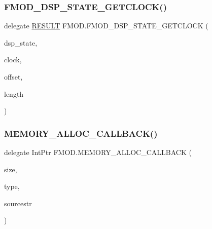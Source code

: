 \subsubsection{\texorpdfstring{F\+M\+O\+D\+\_\+\+D\+S\+P\+\_\+\+S\+T\+A\+T\+E\+\_\+\+G\+E\+T\+C\+L\+O\+C\+K()}{FMOD\_DSP\_STATE\_GETCLOCK()}}
{\footnotesize\ttfamily delegate \hyperlink{namespace_f_m_o_d_a305d1176ef3f8c8815861a60407ac33d}{R\+E\+S\+U\+LT} F\+M\+O\+D.\+F\+M\+O\+D\+\_\+\+D\+S\+P\+\_\+\+S\+T\+A\+T\+E\+\_\+\+G\+E\+T\+C\+L\+O\+CK (\begin{DoxyParamCaption}\item[{ref \hyperlink{struct_f_m_o_d_1_1_d_s_p___s_t_a_t_e}{D\+S\+P\+\_\+\+S\+T\+A\+TE}}]{dsp\+\_\+state,  }\item[{out ulong}]{clock,  }\item[{out uint}]{offset,  }\item[{out uint}]{length }\end{DoxyParamCaption})}

\mbox{\label{namespace_f_m_o_d_aff9ff44d1da401acbc19faf64e06a776}} 
\subsubsection{\texorpdfstring{M\+E\+M\+O\+R\+Y\+\_\+\+A\+L\+L\+O\+C\+\_\+\+C\+A\+L\+L\+B\+A\+C\+K()}{MEMORY\_ALLOC\_CALLBACK()}}
{\footnotesize\ttfamily delegate Int\+Ptr F\+M\+O\+D.\+M\+E\+M\+O\+R\+Y\+\_\+\+A\+L\+L\+O\+C\+\_\+\+C\+A\+L\+L\+B\+A\+CK (\begin{DoxyParamCaption}\item[{uint}]{size,  }\item[{\hyperlink{namespace_f_m_o_d_a3eb4c9654cbf371b668f8eb46358e931}{M\+E\+M\+O\+R\+Y\+\_\+\+T\+Y\+PE}}]{type,  }\item[{\hyperlink{struct_f_m_o_d_1_1_string_wrapper}{String\+Wrapper}}]{sourcestr }\end{DoxyParamCaption})}

\mbox{\label{namespace_f_m_o_d_aa6d78ad454bb4b25659d9de9ca61fc42}} 
